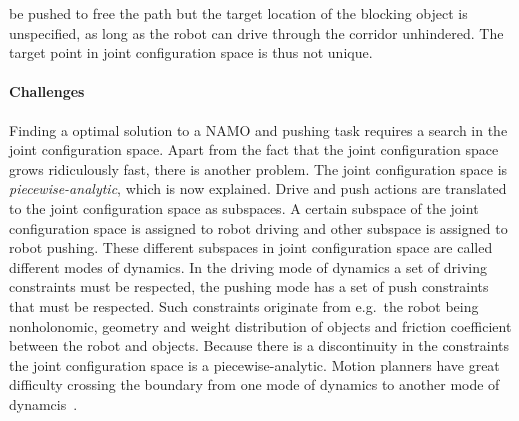 be pushed to free the path but the target location of the blocking object is unspecified, as long as the robot can drive through the corridor unhindered. The target point in joint configuration space is thus not unique.\bs

\paragraph{Challenges}
Finding a optimal solution to a \ac{NAMO} and pushing task requires a search in the joint configuration space. Apart from the fact that the joint configuration space grows ridiculously fast, there is another problem. The joint configuration space is \textit{piecewise-analytic}, which is now explained. Drive and push actions are translated to the joint configuration space as subspaces. A certain subspace of the joint configuration space is assigned to robot driving and other subspace is assigned to robot pushing. These different subspaces in joint configuration space are called different modes of dynamics. In the driving mode of dynamics a set of driving constraints must be respected, the pushing mode has a set of push constraints that must be respected. Such constraints originate from e.g.~the robot being nonholonomic, geometry and weight distribution of objects and friction coefficient between the robot and objects. Because there is a discontinuity in the constraints the joint configuration space is a piecewise-analytic. Motion planners have great difficulty crossing the boundary from one mode of dynamics to another mode of dynamcis~\cite{vega-brown_asymptotically_2020}.\bs

